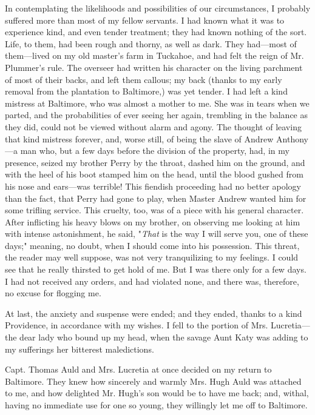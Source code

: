 In contemplating the likelihoods and possibilities of our circumstances,
I probably suffered more than most of my fellow servants. I had known
what it was to experience kind, and even tender treatment; they had
known nothing of the sort. Life, to them, had been rough and thorny, as
well as dark. They had---most of them---lived on my old master's farm in
Tuckahoe, and had felt the reign of Mr. Plummer's rule. The overseer had
written his character on the living parchment of most of their backs,
and left them callous; my back (thanks to my early removal from the
plantation to Baltimore,) was yet tender. I had left a kind mistress at
Baltimore, who was almost a mother to me. She was in tears when we
parted, and the probabilities of ever seeing her again, trembling {} in
the balance as they did, could not be viewed without alarm and agony.
The thought of leaving that kind mistress forever, and, worse still, of
being the slave of Andrew Anthony---a man who, but a few days before the
division of the property, had, in my presence, seized my brother Perry
by the throat, dashed him on the ground, and with the heel of his boot
stamped him on the head, until the blood gushed from his nose and
ears---was terrible! This fiendish proceeding had no better apology than
the fact, that Perry had gone to play, when Master Andrew wanted him for
some trifling service. This cruelty, too, was of a piece with his
general character. After inflicting his heavy blows on my brother, on
observing me looking at him with intense astonishment, he said,
"\emph{That} is the way I will serve you, one of these days;" meaning,
no doubt, when I should come into his possession. This threat, the
reader may well suppose, was not very tranquilizing to my feelings. I
could see that he really thirsted to get hold of me. But I was there
only for a few days. I had not received any orders, and had violated
none, and there was, therefore, no excuse for flogging me.

At last, the anxiety and suspense were ended; and they ended, thanks to
a kind Providence, in accordance with my wishes. I fell to the portion
of Mrs. Lucretia---the dear lady who bound up my head, when the savage
Aunt Katy was adding to my sufferings her bitterest maledictions.

Capt. Thomas Auld and Mrs. Lucretia at once decided on my return to
Baltimore. They knew how sincerely and warmly Mrs. Hugh Auld was
attached {}to me, and how delighted Mr. Hugh's son would be to have me
back; and, withal, having no immediate use for one so young, they
willingly let me off to Baltimore.

